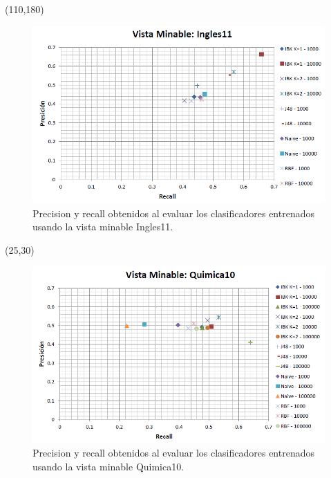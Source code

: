 \documentclass{article}
\begin{document}
\begin{textblock}{80}(110,180)
\begin{figure}[!htb]
\begin{centering}
\includegraphics[scale=0.4]{ingles11}
\par\end{centering}
\caption{Precision y recall obtenidos al evaluar los clasificadores entrenados usando la vista minable Ingles11.}
\label{fig:figura22}
\end{figure}
\end{textblock}
\null
\newpage
\begin{textblock}{80}(25,30)
\begin{figure}[!htb]
\begin{centering}
\includegraphics[scale=0.4]{quimica10}
\par\end{centering}
\caption{Precision y recall obtenidos al evaluar los clasificadores entrenados usando la vista minable Quimica10.}
\label{fig:figura23}
\end{figure}
\end{textblock}
\end{document}
